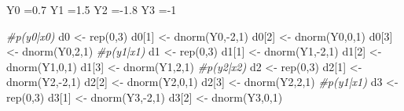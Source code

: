 \documentclass[
]{article}
\newenvironment{Shaded}{\begin{snugshade}}{\end{snugshade}}
\newcommand{\CommentTok}[1]{\textcolor[rgb]{0.56,0.35,0.01}{\textit{#1}}}
\newcommand{\DecValTok}[1]{\textcolor[rgb]{0.00,0.00,0.81}{#1}}
\newcommand{\FloatTok}[1]{\textcolor[rgb]{0.00,0.00,0.81}{#1}}
\newcommand{\FunctionTok}[1]{\textcolor[rgb]{0.00,0.00,0.00}{#1}}
\newcommand{\NormalTok}[1]{#1}
\newcommand{\OtherTok}[1]{\textcolor[rgb]{0.56,0.35,0.01}{#1}}
\newcommand{\SpecialCharTok}[1]{\textcolor[rgb]{0.00,0.00,0.00}{#1}}
\begin{document}
\begin{Shaded}
\begin{Highlighting}[]
\NormalTok{Y0 }\OtherTok{=}\FloatTok{0.7}
\NormalTok{Y1 }\OtherTok{=}\FloatTok{1.5}
\NormalTok{Y2 }\OtherTok{=}\SpecialCharTok{{-}}\FloatTok{1.8}
\NormalTok{Y3 }\OtherTok{=}\SpecialCharTok{{-}}\DecValTok{1}

\CommentTok{\#p(y0|x0)}
\NormalTok{d0 }\OtherTok{\textless{}{-}} \FunctionTok{rep}\NormalTok{(}\DecValTok{0}\NormalTok{,}\DecValTok{3}\NormalTok{)}
\NormalTok{d0[}\DecValTok{1}\NormalTok{] }\OtherTok{\textless{}{-}} \FunctionTok{dnorm}\NormalTok{(Y0,}\SpecialCharTok{{-}}\DecValTok{2}\NormalTok{,}\DecValTok{1}\NormalTok{)}
\NormalTok{d0[}\DecValTok{2}\NormalTok{] }\OtherTok{\textless{}{-}} \FunctionTok{dnorm}\NormalTok{(Y0,}\DecValTok{0}\NormalTok{,}\DecValTok{1}\NormalTok{)}
\NormalTok{d0[}\DecValTok{3}\NormalTok{] }\OtherTok{\textless{}{-}} \FunctionTok{dnorm}\NormalTok{(Y0,}\DecValTok{2}\NormalTok{,}\DecValTok{1}\NormalTok{)}
\CommentTok{\#p(y1|x1)}
\NormalTok{d1 }\OtherTok{\textless{}{-}} \FunctionTok{rep}\NormalTok{(}\DecValTok{0}\NormalTok{,}\DecValTok{3}\NormalTok{)}
\NormalTok{d1[}\DecValTok{1}\NormalTok{] }\OtherTok{\textless{}{-}} \FunctionTok{dnorm}\NormalTok{(Y1,}\SpecialCharTok{{-}}\DecValTok{2}\NormalTok{,}\DecValTok{1}\NormalTok{)}
\NormalTok{d1[}\DecValTok{2}\NormalTok{] }\OtherTok{\textless{}{-}} \FunctionTok{dnorm}\NormalTok{(Y1,}\DecValTok{0}\NormalTok{,}\DecValTok{1}\NormalTok{)}
\NormalTok{d1[}\DecValTok{3}\NormalTok{] }\OtherTok{\textless{}{-}} \FunctionTok{dnorm}\NormalTok{(Y1,}\DecValTok{2}\NormalTok{,}\DecValTok{1}\NormalTok{)}
\CommentTok{\#p(y2|x2)}
\NormalTok{d2 }\OtherTok{\textless{}{-}} \FunctionTok{rep}\NormalTok{(}\DecValTok{0}\NormalTok{,}\DecValTok{3}\NormalTok{)}
\NormalTok{d2[}\DecValTok{1}\NormalTok{] }\OtherTok{\textless{}{-}} \FunctionTok{dnorm}\NormalTok{(Y2,}\SpecialCharTok{{-}}\DecValTok{2}\NormalTok{,}\DecValTok{1}\NormalTok{)}
\NormalTok{d2[}\DecValTok{2}\NormalTok{] }\OtherTok{\textless{}{-}} \FunctionTok{dnorm}\NormalTok{(Y2,}\DecValTok{0}\NormalTok{,}\DecValTok{1}\NormalTok{)}
\NormalTok{d2[}\DecValTok{3}\NormalTok{] }\OtherTok{\textless{}{-}} \FunctionTok{dnorm}\NormalTok{(Y2,}\DecValTok{2}\NormalTok{,}\DecValTok{1}\NormalTok{)}
\CommentTok{\#p(y1|x1)}
\NormalTok{d3 }\OtherTok{\textless{}{-}} \FunctionTok{rep}\NormalTok{(}\DecValTok{0}\NormalTok{,}\DecValTok{3}\NormalTok{)}
\NormalTok{d3[}\DecValTok{1}\NormalTok{] }\OtherTok{\textless{}{-}} \FunctionTok{dnorm}\NormalTok{(Y3,}\SpecialCharTok{{-}}\DecValTok{2}\NormalTok{,}\DecValTok{1}\NormalTok{)}
\NormalTok{d3[}\DecValTok{2}\NormalTok{] }\OtherTok{\textless{}{-}} \FunctionTok{dnorm}\NormalTok{(Y3,}\DecValTok{0}\NormalTok{,}\DecValTok{1}\NormalTok{)}

\end{Highlighting}
\end{Shaded}
\end{document}
